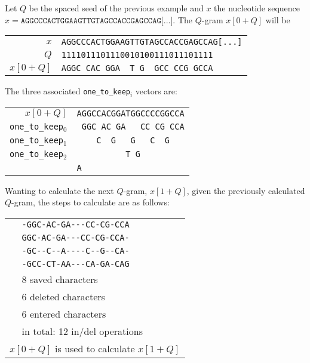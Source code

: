 \begin{example}
	Let $Q$ be the spaced seed of the previous example and $x$ the nucleotide sequence $x = \texttt{AGGCCCACTGGAAGTTGTAGCCACCGAGCCAG[...]}$. The $Q$-gram $x[0 + Q]$ will be
	\begin{center}
		\begin{tabular}{r || l}
			$x$ & \texttt{AGGCCCACTGGAAGTTGTAGCCACCGAGCCAG[...]} \\
			$Q$ & \texttt{1111011101110010100111011101111} \\
			$x[0 + Q]$ & \texttt{AGGC\ CAC\ GGA\ \ T\ G\ \ GCC\ CCG\ GCCA} \\
		\end{tabular}
	\end{center}
	
	The three associated \verb|one_to_keep|$_i$ vectors are:
	\begin{center}
		\begin{tabular}{r || l}
			$x[0 + Q]$ & \texttt{AGGCCACGGATGGCCCCGGCCA} \\
			\verb|one_to_keep|$_0$ & \texttt{\ GGC\ AC\ GA\ \ \ CC\ CG\ CCA} \\
			\verb|one_to_keep|$_1$ & \texttt{\ \ \ \ C\ \ G\ \ \ G\ \ \ C\ \ G\ \ \ } \\
			\verb|one_to_keep|$_2$ & \texttt{\ \ \ \ \ \ \ \ \ \ T\ G\ \ \ \ \ \ \ \ \ } \\
			& \texttt{A\ \ \ \ \ \ \ \ \ \ \ \ \ \ \ } \\
		\end{tabular}
	\end{center}
	
	Wanting to calculate the next $Q$-gram, $x[1 + Q]$, given the previously calculated $Q$-gram, the steps to calculate are as follows:
	\begin{center}
		\begin{tabular}{c | l}
			\multirow{8}{*}{\rotatebox[origin=c]{90}{$\texttt{one\_to\_keep}_0$}}
			& \verb|-GGC-AC-GA---CC-CG-CCA| \\
			& \verb|GGC-AC-GA---CC-CG-CCA-| \\
			& \verb|-GC--C--A----C--G--CA-| \\
			& \verb|-GCC-CT-AA---CA-GA-CAG| \\
			\cmidrule{2-2}
			& 8 saved characters \\
			& 6 deleted characters \\
			& 6 entered characters \\
			\cmidrule{2-2}
			& in total: 12 in/del operations \\
			\bottomrule
			\multicolumn{2}{c}{$x[0 + Q]$ is used to calculate $x[1 + Q]$} \\
		\end{tabular}
	\end{center}
	

\end{example}
